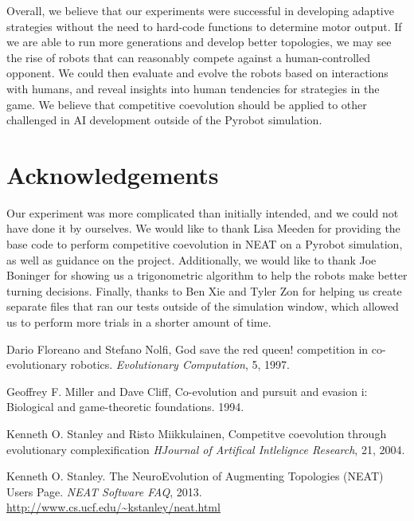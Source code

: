 \documentclass[11pt]{article}
\begin{document}
Overall, we believe that our experiments were successful in developing adaptive strategies without the need to hard-code functions to determine motor output. If we are able to run more generations and develop better topologies, we may see the rise of robots that can reasonably compete against a human-controlled opponent. We could then evaluate and evolve the robots based on interactions with humans, and reveal insights into human tendencies for strategies in the game. We believe that competitive coevolution should be applied to other challenged in AI development outside of the Pyrobot simulation.

\section{Acknowledgements}

Our experiment was more complicated than initially intended, and we could not have done it by ourselves. We would like to thank Lisa Meeden for providing the base code to perform competitive coevolution in NEAT on a Pyrobot simulation, as well as guidance on the project. Additionally, we would  like to thank Joe Boninger for showing us a trigonometric algorithm to help the robots make better turning decisions. Finally, thanks to Ben Xie and Tyler Zon for helping us create separate files that ran our tests outside of the simulation window, which allowed us to perform more trials in a shorter amount of time.

\begin{thebibliography}{1}

   Dario Floreano and Stefano Nolfi, God save the red queen! competition in co-evolutionary robotics. {\em Evolutionary Computation}, 5, 1997.

    Geoffrey F. Miller and Dave Cliff, Co-evolution and pursuit and evasion i: Biological and game-theoretic foundations. 1994.

   Kenneth O. Stanley and Risto Miikkulainen, Competitve coevolution through evolutionary complexification {\em HJournal of Artifical Intlelignce Research}, 21, 2004.
  
   Kenneth O. Stanley. The NeuroEvolution of Augmenting Topologies (NEAT) Users Page. {\em NEAT Software FAQ}, 2013. \url{http://www.cs.ucf.edu/~kstanley/neat.html}


  \end{thebibliography}
\end{document}
